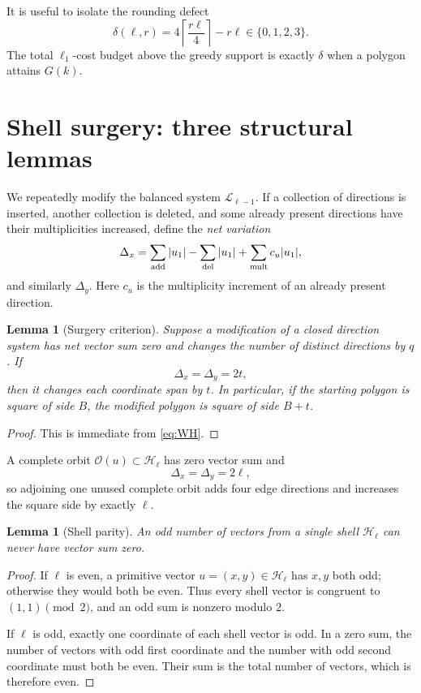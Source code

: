 \documentclass[11pt]{article}
\newtheorem{lemma}[theorem]{Lemma}
\theoremstyle{definition}
\newcommand{\HH}{\mathcal H}
\newcommand{\LL}{\mathcal L}
\begin{document}
It is useful to isolate the rounding defect
\begin{equation}\label{eq:defect}
\delta(\ell,r)
=
4\left\lceil\frac{r\ell}{4}\right\rceil-r\ell
\in\{0,1,2,3\}.
\end{equation}
The total \(\ell_1\)-cost budget above the greedy support is exactly \(\delta\) when a polygon attains \(G(k)\).

\section{Shell surgery: three structural lemmas}

We repeatedly modify the balanced system \(\LL_{\ell-1}\).  If a collection of directions is inserted, another collection is deleted, and some already present directions have their multiplicities increased, define the \emph{net variation}
\[
\Delta_x
=
\sum_{\rm add}|u_1|
-\sum_{\rm del}|u_1|
+\sum_{\rm mult}c_u|u_1|,
\]
and similarly \(\Delta_y\).  Here \(c_u\) is the multiplicity increment of an already present direction.

\begin{lemma}[Surgery criterion]\label{lem:surgery}
Suppose a modification of a closed direction system has net vector sum zero and changes the number of distinct directions by \(q\).  If
\[
\Delta_x=\Delta_y=2t,
\]
then it changes each coordinate span by \(t\).  In particular, if the starting polygon is square of side \(B\), the modified polygon is square of side \(B+t\).
\end{lemma}

\begin{proof}
This is immediate from \eqref{eq:WH}.
\end{proof}

A complete orbit \(\mathcal O(u)\subset\HH_\ell\) has zero vector sum and
\[
\Delta_x=\Delta_y=2\ell,
\]
so adjoining one unused complete orbit adds four edge directions and increases the square side by exactly \(\ell\).

\begin{lemma}[Shell parity]\label{lem:parity}
An odd number of vectors from a single shell \(\HH_\ell\) can never have vector sum zero.
\end{lemma}

\begin{proof}
If \(\ell\) is even, a primitive vector \(u=(x,y)\in\HH_\ell\) has \(x,y\) both odd; otherwise they would both be even.  Thus every shell vector is congruent to \((1,1)\pmod2\), and an odd sum is nonzero modulo \(2\).

If \(\ell\) is odd, exactly one coordinate of each shell vector is odd.  In a zero sum, the number of vectors with odd first coordinate and the number with odd second coordinate must both be even.  Their sum is the total number of vectors, which is therefore even.
\end{proof}
\end{document}
